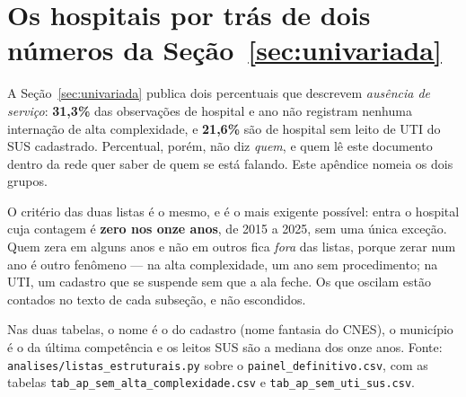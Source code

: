%
\section{Os hospitais por trás de dois números da Seção~\ref{sec:univariada}}
\label{ap:listas}

\setcounter{figure}{0}
\renewcommand{\thefigure}{\thesection.\arabic{figure}}
\setcounter{table}{0}
\renewcommand{\thetable}{\thesection.\arabic{table}}

A Seção~\ref{sec:univariada} publica dois percentuais que descrevem
\emph{ausência de serviço}: \textbf{31,3\%} das observações de hospital e
ano não registram nenhuma internação de alta complexidade, e
\textbf{21,6\%} são de hospital sem leito de UTI do SUS cadastrado.
Percentual, porém, não diz \emph{quem}, e quem lê este documento dentro da
rede quer saber de quem se está falando. Este apêndice nomeia os dois
grupos.

O critério das duas listas é o mesmo, e é o mais exigente possível: entra o
hospital cuja contagem é \textbf{zero nos onze anos}, de 2015 a 2025, sem
uma única exceção. Quem zera em alguns anos e não em outros fica
\emph{fora} das listas, porque zerar num ano é outro fenômeno --- na alta
complexidade, um ano sem procedimento; na UTI, um cadastro que se suspende
sem que a ala feche. Os que oscilam estão contados no texto de cada
subseção, e não escondidos.

\begin{sloppypar}
Nas duas tabelas, o nome é o do cadastro (nome fantasia do CNES), o
município é o da última competência e os leitos SUS são a mediana dos onze
anos. Fonte: \texttt{analises/listas\_estruturais.py} sobre o
\texttt{painel\_definitivo.csv}, com as tabelas
\texttt{tab\_ap\_sem\_alta\_complexidade.csv} e
\texttt{tab\_ap\_sem\_uti\_sus.csv}.
\end{sloppypar}

